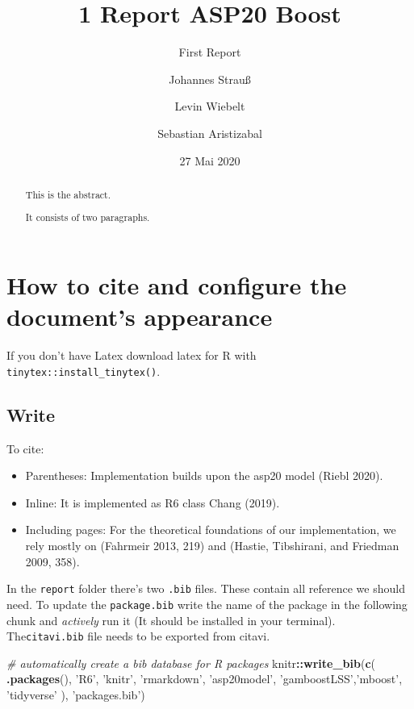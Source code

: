 \documentclass[
]{report}
\title{1 Report ASP20 Boost}
\subtitle{First Report}
\author{Johannes Strauß \and Levin Wiebelt \and Sebastian Aristizabal}
\date{27 Mai 2020}
\newenvironment{Shaded}{\begin{snugshade}}{\end{snugshade}}
\newcommand{\CommentTok}[1]{\textcolor[rgb]{0.56,0.35,0.01}{\textit{#1}}}
\newcommand{\KeywordTok}[1]{\textcolor[rgb]{0.13,0.29,0.53}{\textbf{#1}}}
\newcommand{\NormalTok}[1]{#1}
\newcommand{\OperatorTok}[1]{\textcolor[rgb]{0.81,0.36,0.00}{\textbf{#1}}}
\newcommand{\StringTok}[1]{\textcolor[rgb]{0.31,0.60,0.02}{#1}}
\providecommand{\tightlist}{%
  \setlength{\itemsep}{0pt}\setlength{\parskip}{0pt}}
\begin{document}
\maketitle
\begin{abstract}
This is the abstract.

It consists of two paragraphs.
\end{abstract}

{
\setcounter{tocdepth}{1}
\tableofcontents
}
\hypertarget{how-to-cite-and-configure-the-documents-appearance}{%
\chapter{How to cite and configure the document's
appearance}\label{how-to-cite-and-configure-the-documents-appearance}}

If you don't have Latex download latex for R with
\texttt{tinytex::install\_tinytex()}.

\hypertarget{write}{%
\section{Write}\label{write}}

To cite:

\begin{itemize}
\tightlist
\item
  Parentheses: Implementation builds upon the asp20 model (Riebl 2020).
\item
  Inline: It is implemented as R6 class Chang (2019).
\item
  Including pages: For the theoretical foundations of our
  implementation, we rely mostly on (Fahrmeir 2013, 219) and (Hastie,
  Tibshirani, and Friedman 2009, 358).
\end{itemize}

In the \texttt{report} folder there's two \texttt{.bib} files. These
contain all reference we should need. To update the \texttt{package.bib}
write the name of the package in the following chunk and \emph{actively}
run it (It should be installed in your terminal). The\texttt{citavi.bib}
file needs to be exported from citavi.

\begin{Shaded}
\begin{Highlighting}[]
\CommentTok{# automatically create a bib database for R packages}
\NormalTok{knitr}\OperatorTok{::}\KeywordTok{write_bib}\NormalTok{(}\KeywordTok{c}\NormalTok{(}
  \KeywordTok{.packages}\NormalTok{(), }\StringTok{'R6'}\NormalTok{, }\StringTok{'knitr'}\NormalTok{, }\StringTok{'rmarkdown'}\NormalTok{, }\StringTok{'asp20model'}\NormalTok{, }\StringTok{'gamboostLSS'}\NormalTok{,}\StringTok{'mboost'}\NormalTok{, }\StringTok{'tidyverse'}  
\NormalTok{), }\StringTok{'packages.bib'}\NormalTok{)}
\end{Highlighting}
\end{Shaded}
\end{document}
